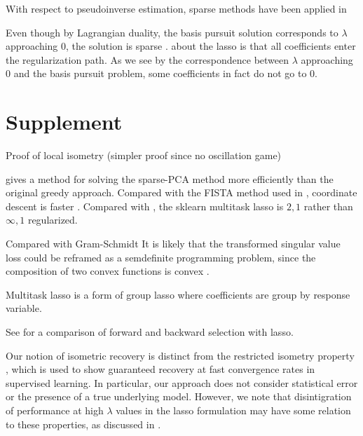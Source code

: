 \documentclass[a4paper,11pt]{article}
\begin{document}
With respect to pseudoinverse estimation, sparse methods have been applied in \cite{Sun2012-vp}

Even though by Lagrangian duality, the basis pursuit solution corresponds to $\lambda$ approaching $0$, the solution is sparse \cite{Tropp04-ju}.
about the lasso is that all coefficients enter the regularization path.
As we see by the correspondence between $\lambda$ approaching $0$ and the basis pursuit problem, some coefficients in fact do not go to $0$. 
\section{Supplement}


Proof of local isometry (simpler proof since no oscillation game)


\cite{Bertsimas2022-qo} gives a method for solving the sparse-PCA method more efficiently than the original greedy approach.
Compared with the FISTA method used in  \cite{Koelle2022-ju, Koelle2024-no}, coordinate descent \cite{Friedman-2007-yb, Meier2008-ts, Qin2013-tx} is faster \cite{Catalina2018-ek, Zhao2023-xn}.
Compared with \cite{Liu2009-yo}, the sklearn multitask lasso is $2,1$ rather than $\infty,1$ regularized.

Compared with Gram-Schmidt
It is likely that the transformed singular value loss could be reframed as a semdefinite programming problem, since the composition of two convex functions is convex \cite{Boyd2004-ql}.

Multitask lasso \cite{Obozinski2006-kq, Yeung2011-fg} is a form of group lasso \cite{Yuan2006-bt} where coefficients are group by response variable.

See \cite{Obozinski2006-kq} for a comparison of forward and backward selection with lasso.

Our notion of isometric recovery is distinct from the restricted isometry property \cite{Candes2005-dd, Hastie2015-qa}, which is used to show guaranteed recovery at fast convergence rates in supervised learning.
In particular, our approach does not consider statistical error or the presence of a true underlying model.
However, we note that disintigration of performance at high $\lambda$ values in the lasso formulation may have some relation to these properties, as discussed in \cite{Koelle2022-ju, Koelle2024-no}.
\end{document}
